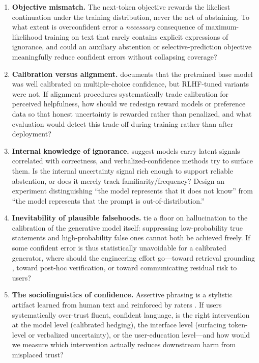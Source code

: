 \documentclass[11pt]{article}
\begin{document}
\begin{enumerate}[label=\textbf{Q\arabic*.},leftmargin=*,itemsep=1em]

\item \textbf{Objective mismatch.} The next-token objective rewards the likeliest continuation under the training distribution, never the act of abstaining. To what extent is overconfident error a \emph{necessary} consequence of maximum-likelihood training on text that rarely contains explicit expressions of ignorance, and could an auxiliary abstention or selective-prediction objective \citep{geifman2017selective} meaningfully reduce confident errors without collapsing coverage?

\item \textbf{Calibration versus alignment.} \citet{openai2023gpt4} documents that the pretrained base model was well calibrated on multiple-choice confidence, but RLHF-tuned variants were not. If alignment procedures systematically trade calibration for perceived helpfulness, how should we redesign reward models or preference data so that honest uncertainty is rewarded rather than penalized, and what evaluation would detect this trade-off during training rather than after deployment?

\item \textbf{Internal knowledge of ignorance.} \citet{kadavath2022know} suggest models carry latent signals correlated with correctness, and verbalized-confidence methods \citep{lin2022teaching} try to surface them. Is the internal uncertainty signal rich enough to support reliable abstention, or does it merely track familiarity/frequency? Design an experiment distinguishing ``the model represents that it does not know'' from ``the model represents that the prompt is out-of-distribution.''

\item \textbf{Inevitability of plausible falsehoods.} \citet{kalai2024calibrated} tie a floor on hallucination to the calibration of the generative model itself: suppressing low-probability true statements and high-probability false ones cannot both be achieved freely. If some confident error is thus statistically unavoidable for a calibrated generator, where should the engineering effort go---toward retrieval grounding \citep{ji2023survey}, toward post-hoc verification, or toward communicating residual risk to users?

\item \textbf{The sociolinguistics of confidence.} Assertive phrasing is a stylistic artifact learned from human text and reinforced by raters \citep{ouyang2022instructgpt,zhou2024relying}. If users systematically over-trust fluent, confident language, is the right intervention at the model level (calibrated hedging), the interface level (surfacing token-level or verbalized uncertainty), or the user-education level---and how would we measure which intervention actually reduces downstream harm from misplaced trust?

\end{enumerate}
\end{document}
